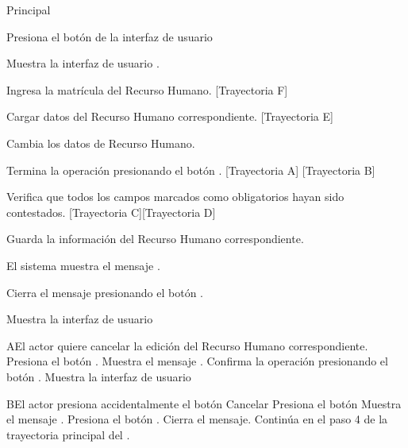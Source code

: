 \begin{UCtrayectoria}{Principal}

    \UCpaso[\UCactor] Presiona el botón  de la interfaz de usuario 

    \UCpaso Muestra la interfaz de usuario .

	\UCpaso Ingresa la matrícula del Recurso Humano. [Trayectoria F]    
    
    \UCpaso Cargar datos del Recurso Humano correspondiente. [Trayectoria E]
    
    \UCpaso[\UCactor] Cambia los datos de Recurso Humano.

    \UCpaso[\UCactor] Termina la operación presionando el botón . [Trayectoria A] [Trayectoria B]

    \UCpaso Verifica que todos los campos marcados como obligatorios hayan sido contestados. [Trayectoria C][Trayectoria D]

    \UCpaso Guarda la información del Recurso Humano correspondiente.

    \UCpaso El sistema muestra el mensaje .

    \UCpaso[\UCactor] Cierra el mensaje presionando el botón .

    \UCpaso Muestra la interfaz de usuario 
\end{UCtrayectoria}




\begin{UCtrayectoriaA}{A}{El actor quiere cancelar la edición  del Recurso Humano correspondiente.}
	\UCpaso[\UCactor] Presiona el botón .
    \UCpaso Muestra el mensaje .
    \UCpaso[\UCactor] Confirma la operación presionando el botón .
    \UCpaso Muestra la interfaz de usuario 
\end{UCtrayectoriaA}



\begin{UCtrayectoriaA}{B}{El actor presiona accidentalmente el botón Cancelar}
	\UCpaso[\UCactor] Presiona el botón 
    \UCpaso Muestra el mensaje .
    \UCpaso[\UCactor] Presiona el botón .
    \UCpaso Cierra el mensaje.
    \UCpaso Continúa en el paso 4 de la trayectoria principal del .
\end{UCtrayectoriaA}

